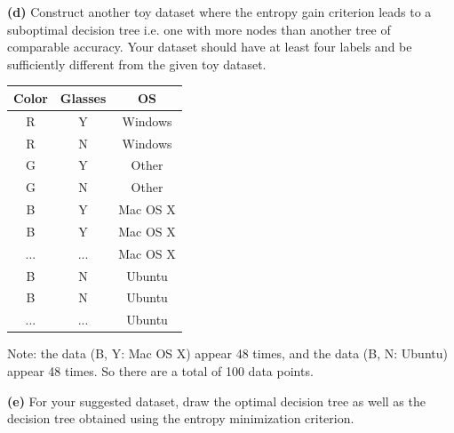 \documentclass[11pt]{article}
\newcounter{marks}
\def\maxmarks#1{\extramark{#1}\addtocounter{marks}{#1}}
\def\extramark#1{
  \begin{flushright}
  [\emph{#1 points}]
  \end{flushright}
}
\renewcommand{\part}[1] {\vspace{.10in} {\bf (#1)}}
\begin{document}
\part{d} Construct another toy dataset where the entropy gain criterion leads to a suboptimal decision tree i.e. one with more nodes than another tree of comparable accuracy. Your dataset should have at least four labels and be sufficiently different from the given toy dataset.
\maxmarks{3} 

{\color{blue}
\begin{center}
\begin{tabular}{ccc}
	Color & Glasses & OS \\ \hline
	R & Y & Windows \\
	R & N & Windows \\
	G & Y & Other \\
	G & N & Other \\
	B & Y & Mac OS X \\
	B & Y & Mac OS X \\
	... & ... & Mac OS X \\
	B & N & Ubuntu \\
	B & N & Ubuntu \\
	... & ... & Ubuntu \\
\end{tabular}
\end{center}
Note: the data (B, Y: Mac OS X) appear 48 times, and the data (B, N: Ubuntu) appear 48 times. 
So there are a total of 100 data points.}

\part{e} For your suggested dataset, draw the optimal decision tree as well as the decision tree obtained using the entropy minimization criterion.
\maxmarks{3} 
\end{document}
